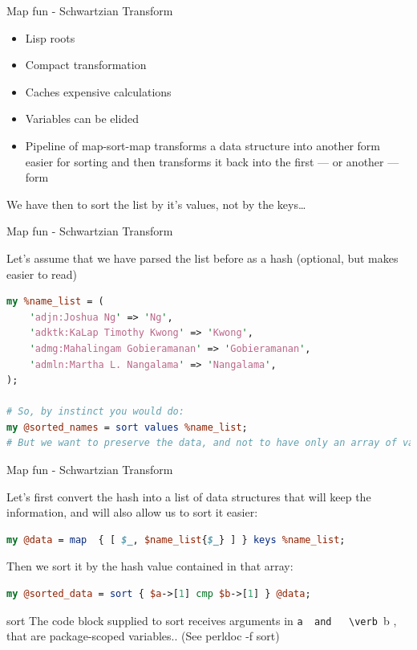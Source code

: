 \documentclass[10pt]{beamer}
\begin{document}
 \begin{frame}[fragile]{Map fun - Schwartzian Transform}

 \begin{itemize}
     \item Lisp roots
     \item Compact transformation
     \item Caches expensive calculations
     \item Variables can be elided
     \item Pipeline of map-sort-map transforms a data structure into another form easier for sorting and then transforms it back into the first — or another — form
 \end{itemize}

 We have then to sort the list by it's values, not by the keys\ldots
 \end{frame}


 \begin{frame}[fragile]{Map fun - Schwartzian Transform}

 Let's assume that we have parsed the list before as a hash (optional, but makes easier to read)

\begin{lstlisting}[language=perl]
my %name_list = (
    'adjn:Joshua Ng' => 'Ng',
    'adktk:KaLap Timothy Kwong' => 'Kwong',
    'admg:Mahalingam Gobieramanan' => 'Gobieramanan',
    'admln:Martha L. Nangalama' => 'Nangalama',
);

# So, by instinct you would do:
my @sorted_names = sort values %name_list;
# But we want to preserve the data, and not to have only an array of values.
\end{lstlisting}
 \end{frame}


 \begin{frame}[fragile]{Map fun - Schwartzian Transform}

 Let's  first convert the hash into a list of data structures that will keep  the information, and will also allow us to sort it easier:
\begin{lstlisting}[language=perl]
 my @data = map  { [ $_, $name_list{$_} ] } keys %name_list;
\end{lstlisting}
Then we sort it by the hash value contained in that array:
\begin{lstlisting}[language=perl]
    my @sorted_data = sort { $a->[1] cmp $b->[1] } @data;
\end{lstlisting}
\begin{alertblock}{sort}
The code block supplied to sort receives arguments in \verb $a  and   \verb $b , that are package-scoped variables.. (See perldoc -f sort)
\end{alertblock}
 \end{frame}
\end{document}
